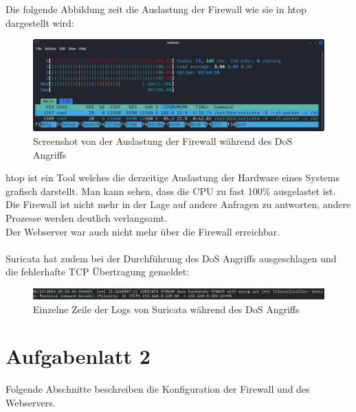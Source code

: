 \documentclass[
    a4paper,
    pagesize,
	pdftex,
    12pt,
]{scrartcl}
\begin{document}
Die folgende Abbildung zeit die Auslastung der Firewall wie sie in htop dargestellt wird:
\begin{figure}[H]
	\centering
	\includegraphics[width=12cm]{dos-htop.png}
	\caption{Screenshot von der Auslastung der Firewall während des DoS Angriffs}
	\label{fig:dos-htop}
\end{figure}
htop ist ein Tool welches die derzeitige Auslastung der Hardware eines Systems grafisch darstellt. Man kann sehen, dass die CPU zu fast 100\% ausgelastet ist. Die Firewall ist nicht mehr in der Lage auf andere Anfragen zu antworten, andere Prozesse werden deutlich verlangsamt. \\
Der Webserver war auch nicht mehr über die Firewall erreichbar.
\\ \\
Suricata hat zudem bei der Durchführung des DoS Angriffs ausgeschlagen und die fehlerhafte TCP Übertragung gemeldet:
\begin{figure}[H]
	\centering
	\includegraphics[width=17cm]{suricata-spam-dos.png}
	\caption{Einzelne Zeile der Logs von Suricata während des DoS Angriffs}
	\label{fig:dos-suricata}
\end{figure}

\newpage
\section{Aufgabenlatt 2}
Folgende Abschnitte beschreiben die Konfiguration der Firewall und des Webservers.
\end{document}
